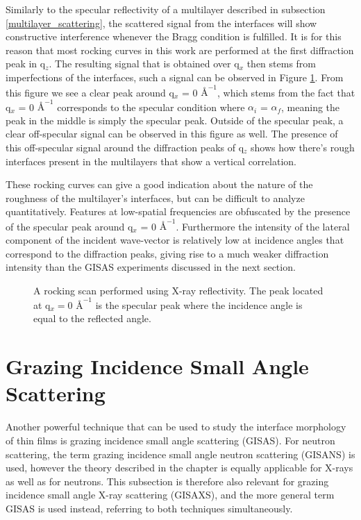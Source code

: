 Similarly to the specular reflectivity of a multilayer described in subsection \ref{multilayer_scattering}, the scattered signal from the interfaces will show constructive interference whenever the Bragg condition is fulfilled. It is for this reason that most rocking curves in this work are performed at the first diffraction peak in q$_z$. The resulting signal that is obtained over q$_x$ then stems from imperfections of the interfaces, such a signal can be observed in Figure \ref{rocking_curve_figure}. From this figure we see a clear peak around q$_x$ = 0 $Å^{-1}$, which stems from the fact that q$_x$ =  0 $Å^{-1}$ corresponds to the specular condition where $\alpha_i$ = $\alpha_f$, meaning the peak in the middle is simply the specular peak. Outside of the specular peak, a clear off-specular signal can be observed in this figure as well. The presence of this off-specular signal around the diffraction peaks of q$_z$ shows how there's rough interfaces present in the multilayers that show a vertical correlation. 

These rocking curves can give a good indication about the nature of the roughness of the multilayer's interfaces, but can be difficult to analyze quantitatively. Features at low-spatial frequencies are obfuscated by the presence of the specular peak around q$_x$ = 0 $Å^{-1}$. Furthermore the intensity of the lateral component of the incident wave-vector is relatively low at incidence angles that correspond to the diffraction peaks, giving rise to a much weaker diffraction intensity than the GISAS experiments discussed in the next section.
\begin{figure}
	\centering
	\def\svgwidth{\textwidth}
	
	\caption{A rocking scan performed using X-ray reflectivity. The peak located at q$_x = 0$ $Å^{-1}$ is the specular peak where the incidence angle is equal to the reflected angle.}
	\label{rocking_curve_figure}
\end{figure}

\section{Grazing Incidence Small Angle Scattering}\label{GISANS_section}
Another powerful technique that can be used to study the interface morphology of thin films is grazing incidence small angle scattering (GISAS). For neutron scattering, the term grazing incidence small angle neutron scattering (GISANS) is used, however the theory described in the chapter is equally applicable for X-rays as well as for neutrons. This subsection is therefore also relevant for grazing incidence small angle X-ray scattering (GISAXS), and the more general term GISAS is used instead, referring to both techniques simultaneously. 
